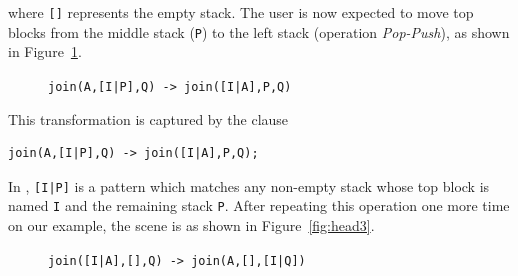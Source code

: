 \noindent 
where \texttt{[]} represents the empty stack. The user is now expected
to move top blocks from the middle stack (\texttt{P}) to the left
stack (operation \textsl{Pop\hyp{}Push}), as shown in
Figure~\ref{fig:clause2}.
\begin{figure}[!h]
\centering
{}
\quad
{}
\caption{\texttt{\small join(A,[I|P],Q) -> join([I|A],P,Q)}
\label{fig:clause2}}
\end{figure}
This transformation is captured by the \erlang clause
{\small
\begin{verbatim}
join(A,[I|P],Q) -> join([I|A],P,Q);
\end{verbatim}
}
\noindent In \erlang, \texttt{[I|P]} is a pattern which matches any
non\hyp{}empty stack whose top block is named \texttt{I} and the
remaining stack \texttt{P}. After repeating this operation one more
time on our example, the scene is as shown in Figure~\ref{fig:head3}.
\begin{figure}[!h]
\centering
{}
\quad
{}
\caption{\texttt{\small join([I|A],[],Q) -> join(A,[],[I|Q])}
\label{fig:clause3}}
\end{figure}
